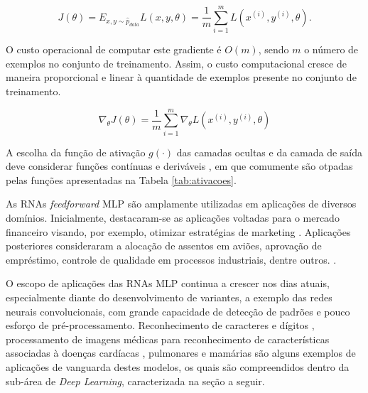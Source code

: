 \begin{equation}\label{eq:custo}
J(\theta) = E_{x,y \sim \hat{p}_{data}} L(x, y, \theta) = \frac{1}{m} \sum_{i=1}^{m} L(x^{(i)}, y^{(i)}, \theta).
\end{equation}

O custo operacional de computar este gradiente é $O(m)$, sendo $m$ o número de exemplos no conjunto de treinamento. Assim, o custo computacional cresce de maneira proporcional e linear à quantidade de exemplos presente no conjunto de treinamento.

\begin{equation}\label{eq:gradiente}
	\nabla_{\theta} J(\theta) = \frac{1}{m} \sum_{i=1}^{m} \nabla_{\theta} L(x^{(i)}, y^{(i)}, \theta)
\end{equation}

\fi

A escolha da função de ativação $g(\cdot)$ das camadas ocultas e da camada de saída deve considerar funções contínuas e deriváveis \cite{hornik1991approximation}, em que comumente são otpadas pelas funções apresentadas na Tabela  \ref{tab:ativacoes}.






As RNAs \emph{feedforward} MLP são amplamente utilizadas em aplicações de diversos domínios. Inicialmente, destacaram-se as aplicações voltadas para o mercado financeiro visando, por exemplo, otimizar estratégias de marketing \cite{widrow1994neural}. Aplicações posteriores consideraram a alocação de assentos em aviões, aprovação de empréstimo, controle de qualidade em processos industriais, dentre outros. .

O escopo de aplicações das RNAs MLP continua a crescer nos dias atuais, especialmente diante do desenvolvimento de variantes, a exemplo das redes neurais convolucionais, com grande capacidade de detecção de padrões e pouco esforço de pré-processamento. Reconhecimento de caracteres e dígitos  \cite{lenet}, processamento de imagens médicas para reconhecimento de características associadas à doenças cardíacas \cite{oktay2018anatomically}, pulmonares \cite{mingchen2018holistic} e mamárias \cite{dubrovina2018mammography} são alguns exemplos de aplicações de vanguarda destes modelos, os quais são compreendidos dentro da sub-área de \emph{Deep Learning}, caracterizada na seção a seguir.
